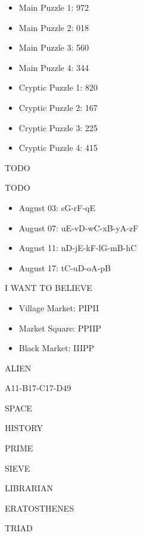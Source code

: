 
\begin{itemize}
\item Main Puzzle 1: 972
\item Main Puzzle 2: 018
\item Main Puzzle 3: 560
\item Main Puzzle 4: 344
\item Cryptic Puzzle 1: 820
\item Cryptic Puzzle 2: 167
\item Cryptic Puzzle 3: 225
\item Cryptic Puzzle 4: 415
\end{itemize}


TODO


TODO


\begin{itemize}
\item August 03: sG-rF-qE 
\item August 07: uE-vD-wC-xB-yA-zF
\item August 11: nD-jE-kF-lG-mB-hC
\item August 17: tC-uD-oA-pB
\end{itemize}


I WANT TO BELIEVE


\begin{itemize}
\item Village Market: PIPII
\item Market Square: PPIIP 
\item Black Market: IIIPP
\end{itemize}


ALIEN


A11-B17-C17-D49


SPACE


HISTORY


PRIME


SIEVE


LIBRARIAN


ERATOSTHENES


TRIAD
